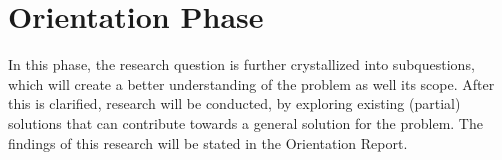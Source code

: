 \section{Orientation Phase}
In this phase, the research question is further crystallized into subquestions, which will create a better understanding of the problem as well its scope. After this is clarified, research will be conducted, by exploring existing (partial) solutions that can contribute towards a general solution for the problem. The findings of this research will be stated in the Orientation Report.

